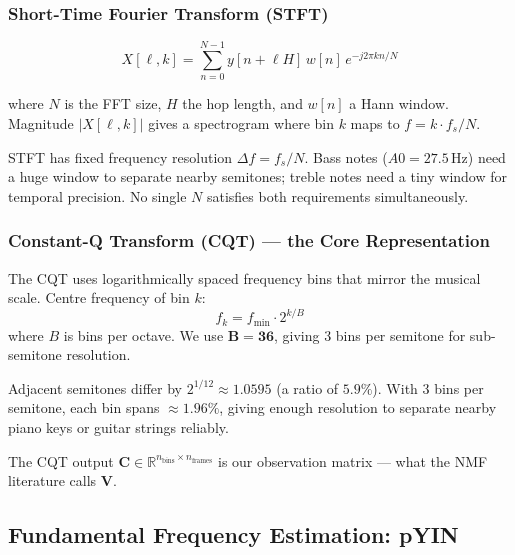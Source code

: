 \documentclass[12pt, a4paper]{article}
\begin{document}
\subsubsection{Short-Time Fourier Transform (STFT)}

\begin{equation}
  X[\ell, k] = \sum_{n=0}^{N-1} y[n + \ell H]\, w[n]\, e^{-j2\pi kn/N}
\end{equation}

where $N$ is the FFT size, $H$ the hop length, and $w[n]$ a Hann window.
Magnitude $|X[\ell,k]|$ gives a spectrogram where bin $k$ maps to
$f = k\cdot f_s/N$.

\begin{warnbox}
  STFT has fixed frequency resolution $\Delta f = f_s/N$.
  Bass notes ($A0 = 27.5\,\text{Hz}$) need a huge window to separate
  nearby semitones; treble notes need a tiny window for temporal precision.
  No single $N$ satisfies both requirements simultaneously.
\end{warnbox}

\subsubsection{Constant-Q Transform (CQT) --- the Core Representation}

The CQT uses logarithmically spaced frequency bins that mirror the musical
scale. Centre frequency of bin $k$:
\begin{equation}
  f_k = f_{\min} \cdot 2^{k/B}
\end{equation}
where $B$ is bins per octave. We use $\mathbf{B = 36}$, giving 3 bins per
semitone for sub-semitone resolution.

\begin{mathbox}
  Adjacent semitones differ by $2^{1/12}\approx 1.0595$ (a ratio of $5.9\%$).
  With 3 bins per semitone, each bin spans $\approx 1.96\%$, giving enough
  resolution to separate nearby piano keys or guitar strings reliably.
\end{mathbox}

The CQT output $\mathbf{C}\in\mathbb{R}^{n_{\text{bins}}\times n_{\text{frames}}}$
is our observation matrix --- what the NMF literature calls $\mathbf{V}$.

\subsection{Fundamental Frequency Estimation: pYIN}
\end{document}

